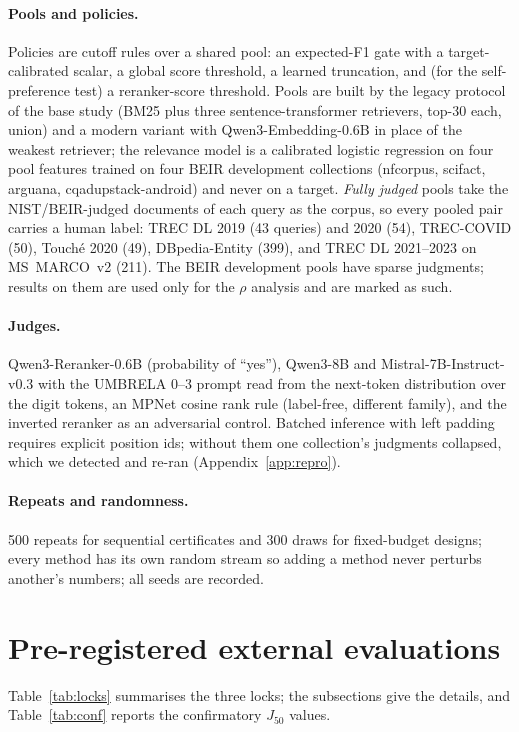 \documentclass{article}
\newcommand{\Jfifty}{J_{50}}
\begin{document}
\paragraph{Pools and policies.} Policies are cutoff rules over a shared pool: an expected-F1 gate with a target-calibrated scalar, a global score threshold, a learned truncation, and (for the self-preference test) a reranker-score threshold. Pools are built by the legacy protocol of the base study (BM25 plus three sentence-transformer retrievers, top-30 each, union) and a modern variant with Qwen3-Embedding-0.6B in place of the weakest retriever; the relevance model is a calibrated logistic regression on four pool features trained on four BEIR development collections (nfcorpus, scifact, arguana, cqadupstack-android) and never on a target. \emph{Fully judged} pools take the NIST/BEIR-judged documents of each query as the corpus, so every pooled pair carries a human label: TREC DL 2019 (43 queries) and 2020 (54), TREC-COVID (50), Touch\'e 2020 (49), DBpedia-Entity (399), and TREC DL 2021--2023 on MS~MARCO~v2 (211). The BEIR development pools have sparse judgments; results on them are used only for the $\rho$ analysis and are marked as such.
\paragraph{Judges.} Qwen3-Reranker-0.6B (probability of ``yes''), Qwen3-8B and Mistral-7B-Instruct-v0.3 with the UMBRELA 0--3 prompt \citep{upadhyay2024umbrela} read from the next-token distribution over the digit tokens, an MPNet cosine rank rule (label-free, different family), and the inverted reranker as an adversarial control. Batched inference with left padding requires explicit position ids; without them one collection's judgments collapsed, which we detected and re-ran (Appendix~\ref{app:repro}).
\paragraph{Repeats and randomness.} 500 repeats for sequential certificates and 300 draws for fixed-budget designs; every method has its own random stream so adding a method never perturbs another's numbers; all seeds are recorded.

\section{Pre-registered external evaluations}\label{sec:prereg}
Table~\ref{tab:locks} summarises the three locks; the subsections give the details, and Table~\ref{tab:conf} reports the confirmatory $\Jfifty$ values.


\end{document}
